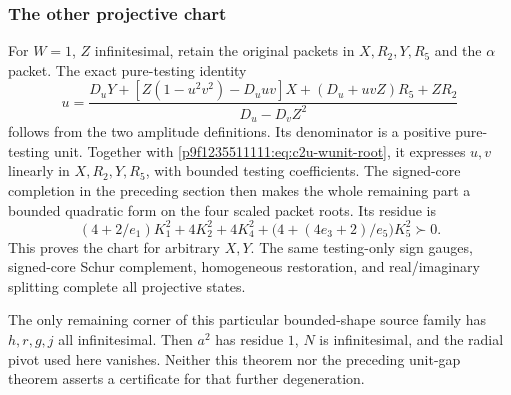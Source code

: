 \subsubsection*{The other projective chart}
For $W=1$, $Z$ infinitesimal, retain the original packets in
$X,R_2,Y,R_5$ and the $\alpha$ packet.  The exact pure-testing identity
\begin{equation}
u=\frac{D_uY+[Z(1-u^2v^2)-D_uuv]X+(D_u+uvZ)R_5+ZR_2}
{D_u-D_vZ^2}
\label{p53752031d16c:eq:c2y-Wunit}
\end{equation}
follows from the two amplitude definitions.  Its denominator is a
positive pure-testing unit.  Together with \eqref{p9f1235511111:eq:c2u-wunit-root},
it expresses $u,v$ linearly in $X,R_2,Y,R_5$, with bounded testing
coefficients.  The signed-core completion in the preceding section
then makes the whole remaining part a bounded quadratic form on the
four scaled packet roots.  Its residue is
\[
(4+2/e_1)K_1^2+4K_2^2+4K_4^2+
\bigl(4+(4e_3+2)/e_5\bigr)K_5^2\succ0.
\]
This proves the chart for arbitrary $X,Y$.  The same testing-only sign
gauges, signed-core Schur complement, homogeneous restoration, and
real/imaginary splitting complete all projective states.

The only remaining corner of this particular bounded-shape source
family has $h,r,g,j$ all infinitesimal.  Then $a^2$ has residue $1$,
$N$ is infinitesimal, and the radial pivot used here vanishes.
Neither this theorem nor the preceding unit-gap theorem asserts a
certificate for that further degeneration.

